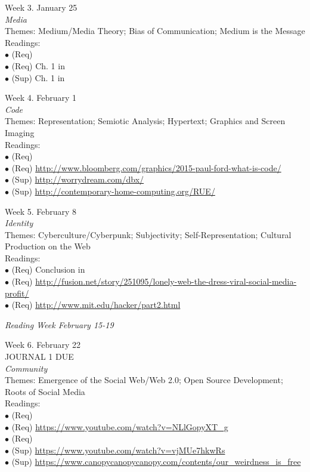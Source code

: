 \documentclass[10pt]{article}
\begin{document}
Week 3. January 25 \\
\textit{Media} \\
Themes: Medium/Media Theory; Bias of Communication; Medium is the Message \\
	Readings: \\ 
	$\bullet$ (Req) \\
	$\bullet$ (Req) Ch. 1 in \\
	$\bullet$ (Sup) Ch. 1 in 

Week 4. February 1 \\
\textit{Code} \\
Themes: Representation; Semiotic Analysis; Hypertext; Graphics and Screen Imaging \\ 
	Readings: \\
	$\bullet$ (Req) \\
	$\bullet$ (Req) \url{http://www.bloomberg.com/graphics/2015-paul-ford-what-is-code/}\\
	$\bullet$ (Sup) \url{http://worrydream.com/dbx/}\\
	$\bullet$ (Sup) \url{http://contemporary-home-computing.org/RUE/}

Week 5. February 8 \\
\textit{Identity} \\
Themes: Cyberculture/Cyberpunk; Subjectivity; Self-Representation; Cultural Production on the Web \\ 
	Readings: \\
	$\bullet$ (Req) Conclusion in \\
	$\bullet$ (Req) \url{http://fusion.net/story/251095/lonely-web-the-dress-viral-social-media-profit/}\\
	$\bullet$ (Req) \url{http://www.mit.edu/hacker/part2.html}

\textit{Reading Week February 15-19}

Week 6. February 22 \\
JOURNAL 1 DUE \\
\textit{Community} \\
Themes: Emergence of the Social Web/Web 2.0; Open Source Development; Roots of Social Media \\
	Readings: \\
	$\bullet$ (Req) \\
	$\bullet$ (Req) \url{https://www.youtube.com/watch?v=NLlGopyXT_g}\\
	$\bullet$ (Req) \\
	$\bullet$ (Sup) \url{https://www.youtube.com/watch?v=vjMUe7hkwRs}\\
	$\bullet$ (Sup) \url{https://www.canopycanopycanopy.com/contents/our_weirdness_is_free}
\end{document}
